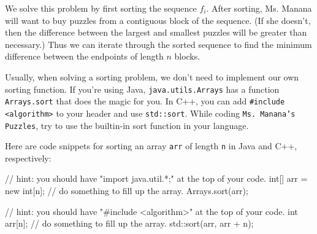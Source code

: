 We solve this problem by first sorting the sequence $f_i$. After sorting, Ms. Manana will want to buy puzzles from a contiguous block of the sequence. (If she doesn't, then the difference between the largest and smallest puzzles will be greater than necessary.) Thus we can iterate through the sorted sequence to find the minimum difference between the endpoints of length $n$ blocks.

Usually, when solving a sorting problem, we don't need to implement our own sorting function. If you're using Java, \texttt{java.utils.Arrays} has a function \texttt{Arrays.sort} that does the magic for you. In C++, you can add \texttt{\#include <algorithm>} to your header and use \texttt{std::sort}. While coding \texttt{Ms. Manana's Puzzles}, try to use the builtin-in sort function in your language.

Here are code snippets for sorting an array \texttt{arr} of length \texttt{n} in Java and C++, respectively:

\begin{mylstlisting}
// hint: you should have "import java.util.*;" at the top of your code.
int[] arr = new int[n];
// do something to fill up the array.
Arrays.sort(arr);
\end{mylstlisting}

\begin{mylstlisting}
// hint: you should have "#include <algorithm>" at the top of your code.
int arr[n];
// do something to fill up the array.
std::sort(arr, arr + n);
\end{mylstlisting}
